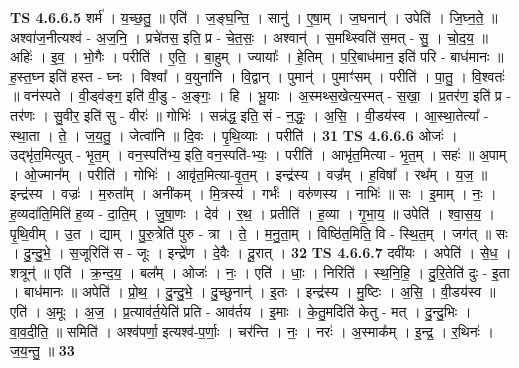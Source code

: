 \documentclass[17pt]{extarticle}
\begin{document}
                  \newline
                                \textbf{ TS 4.6.6.5} \newline
                  शर्म॑ । य॒च्छ॒तु॒ ॥ एति॑ । ज॒ङ्घ॒न्ति॒ । सानु॑ । ए॒षा॒म् । ज॒घनान्॑ । उपेति॑ । जि॒घ्न॒ते॒ ॥ अश्वा॑ज॒नीत्यश्व॑ - अ॒ज॒नि॒ । प्रचे॑तस॒ इति॒ प्र - चे॒त॒सः॒ । अश्वान्॑ । स॒मथ्स्विति॑ स॒मत् - सु॒ । चो॒द॒य॒ ॥ अहिः॑ । इ॒व॒ । भो॒गैः । परीति॑ । ए॒ति॒ । बा॒हुम् । ज्यायाः᳚ । हे॒तिम् । प॒रि॒बाध॑मान॒ इति॑ परि - बाध॑मानः ॥ ह॒स्त॒घ्न इति॑ हस्त - घ्नः । विश्वा᳚ । व॒युना॑नि । वि॒द्वान् । पुमान्॑ । पुमाꣳ॑सम् । परीति॑ । पा॒तु॒ । वि॒श्वतः॑ ॥ वन॑स्पते । वी॒ड्व॑ङ्ग॒ इति॑ वी॒डु - अ॒ङ्गः॒ । हि । भू॒याः । अ॒स्मथ्स॒खेत्य॒स्मत् - स॒खा॒ । प्र॒तर॑ण॒ इति॑ प्र - तर॑णः । सु॒वीर॒ इति॑ सु - वीरः॑ ॥ गोभिः॑ । सन्न॑द्ध॒ इति॒ सं - न॒द्धः॒ । अ॒सि॒ । वी॒डय॑स्व । आ॒स्था॒तेत्या᳚ - स्था॒ता । ते॒ । ज॒य॒तु॒ । जेत्वा॑नि ॥ दि॒वः । पृ॒थि॒व्याः । परीति॑ । \textbf{  31} \newline
                  \newline
                                \textbf{ TS 4.6.6.6} \newline
                  ओजः॑ । उद्भृ॑त॒मित्युत् - भृ॒त॒म् । वन॒स्पति॑भ्य॒ इति॒ वन॒स्पति॑-भ्यः॒ । परीति॑ । आभृ॑त॒मित्या - भृ॒त॒म् । सहः॑ ॥ अ॒पाम् । ओ॒ज्मान᳚म् । परीति॑ । गोभिः॑ । आवृ॑त॒मित्या-वृ॒त॒म् । इन्द्र॑स्य । वज्र᳚म् । ह॒विषा᳚ । रथ᳚म् । य॒ज॒ ॥ इन्द्र॑स्य । वज्रः॑ । म॒रुता᳚म् । अनी॑कम् । मि॒त्रस्य॑ । गर्भः॑ । वरु॑णस्य । नाभिः॑ ॥ सः । इ॒माम् । नः॒ । ह॒व्यदा॑ति॒मिति॑ ह॒व्य - दा॒ति॒म् । जु॒षा॒णः । देव॑ । र॒थ॒ । प्रतीति॑ । ह॒व्या । गृ॒भा॒य॒ ॥ उपेति॑ । श्वा॒स॒य॒ । पृ॒थि॒वीम् । उ॒त । द्याम् । पु॒रु॒त्रेति॑ पुरु - त्रा । ते॒ । म॒नु॒ता॒म् । विष्ठि॑त॒मिति॒ वि - स्थि॒त॒म् । जग॑त् ॥ सः । दु॒न्दु॒भे॒ । स॒जूरिति॑ स - जूः । इन्द्रे॑ण । दे॒वैः । दू॒रात् । \textbf{  32} \newline
                  \newline
                                \textbf{ TS 4.6.6.7} \newline
                  दवी॑यः । अपेति॑ । से॒ध॒ । शत्रून्॑ ॥ एति॑ । क्र॒न्द॒य॒ । बल᳚म् । ओजः॑ । नः॒ । एति॑ । धाः॒ । निरिति॑ । स्थ॒नि॒हि॒ । दु॒रि॒तेति॑ दुः - इ॒ता । बाध॑मानः ॥ अपेति॑ । प्रो॒थ॒ । दु॒न्दु॒भे॒ । दु॒च्छुनान्॑ । इ॒तः । इन्द्र॑स्य । मु॒ष्टिः । अ॒सि॒ । वी॒डय॑स्व ॥ एति॑ । अ॒मूः । अ॒ज॒ । प्र॒त्याव॑र्त॒येति॑ प्रति - आव॑र्तय । इ॒माः । के॒तु॒मदिति॑ केतु - मत् । दु॒न्दु॒भिः । वा॒व॒दी॒ति॒ ॥ समिति॑ । अश्व॑पर्णा॒ इत्यश्व॑-प॒र्णाः॒ । चर॑न्ति । नः॒ । नरः॑ । अ॒स्माक᳚म् । इ॒न्द्र॒ । र॒थिनः॑ । ज॒य॒न्तु॒ ॥ \textbf{  33} \newline
                  \newline
\end{document}
